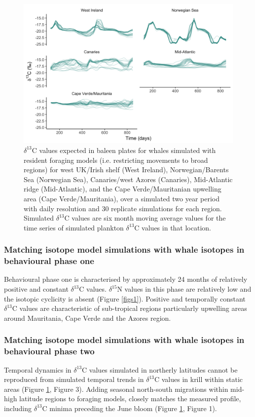 \documentclass[a4paper,10pt]{article}
\begin{document}
  \begin{figure}[!htbp]
    \centering
      \includegraphics[width=\linewidth]{figures/Figure-S4-regions-d13C.png}
      \caption{$\delta^{13}$C values expected in baleen plates for whales simulated with resident foraging models (i.e. restricting movements to broad regions) for west UK/Irish shelf (West Ireland), Norwegian/Barents Sea (Norwegian Sea), Canaries/west Azores (Canaries), Mid-Atlantic ridge (Mid-Atlantic), and the Cape Verde/Mauritanian upwelling area (Cape Verde/Mauritania), over a simulated two year period with daily resolution and 30 replicate simulations for each region. 
      Simulated $\delta^{13}$C values are six month moving average values for the time series of simulated plankton $\delta^{13}$C values in that location.}
      \label{figs4}
  \end{figure}
 
\subsubsection*{Matching isotope model simulations with whale isotopes in behavioural phase one}
Behavioural phase one is characterised by approximately 24 months of relatively positive and constant $\delta^{13}$C values. 
$\delta^{15}$N values in this phase are relatively low and the isotopic cyclicity is absent (Figure \ref{figs1}). 
Positive and temporally constant $\delta^{13}$C values are characteristic of sub-tropical regions particularly upwelling areas around Mauritania, Cape Verde and the Azores region.
 
\subsubsection*{Matching isotope model simulations with whale isotopes in behavioural phase two}
Temporal dynamics in $\delta^{13}$C values simulated in northerly latitudes cannot be reproduced from simulated temporal trends in $\delta^{13}$C values in krill within static areas (Figure \ref{figs4}, Figure 3). 
Adding seasonal north-south migrations within mid-high latitude regions to foraging models, closely matches the measured profile, including $\delta^{13}$C minima preceding the June bloom (Figure \ref{figs4}, Figure 1).
\end{document}

